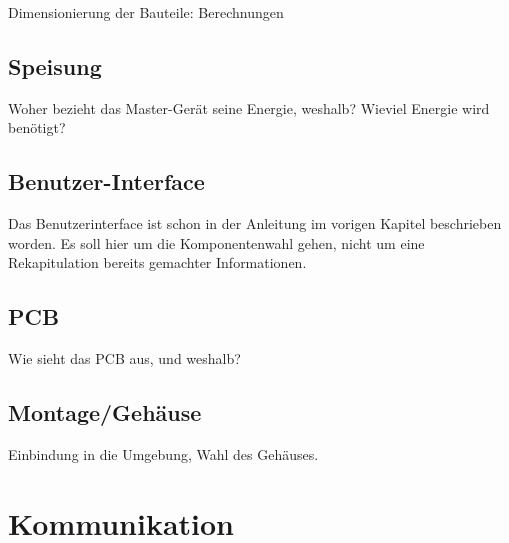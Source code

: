 \anweisung Dimensionierung der Bauteile: Berechnungen


\subsection{Speisung}
\label{subsec:mastergerat:speisung}

Woher bezieht das Master-Ger\"at  seine Energie, weshalb? Wieviel Energie wird
ben\"otigt?


\subsection{Benutzer-Interface}
\label{subsec:mastergerat:interface}

\anweisung Das Benutzerinterface ist schon in der Anleitung im vorigen Kapitel
beschrieben worden. Es soll  hier um die Komponentenwahl gehen,  nicht um eine
Rekapitulation bereits gemachter Informationen.

\subsection{PCB}
\label{subsec:mastergerat:pcb}

Wie sieht das PCB aus, und weshalb?

\subsection{Montage/Geh\"ause}
\label{subsec:mastergerat:pcb}

Einbindung in die Umgebung, Wahl des Geh\"auses.


\section{Kommunikation}
\label{sec:kommunikation}

